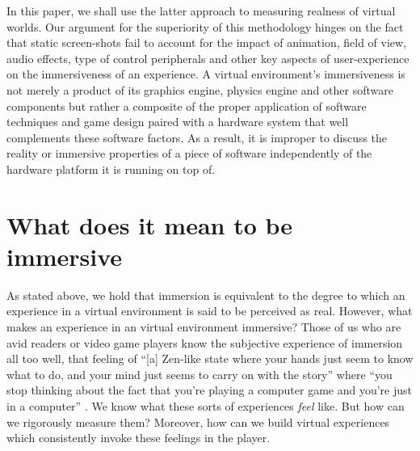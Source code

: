  In this paper, we shall use the latter approach to measuring realness of virtual worlds. Our argument for the superiority of this methodology hinges on the fact that static screen-shots fail to account for the impact of animation, field of view, audio effects, type of control peripherals and other key aspects of user-experience on the immersiveness of an experience. A virtual environment's immersiveness is not merely a product of its graphics engine, physics engine and other software components but rather a composite of the proper application of software techniques and game design paired with a hardware system that well complements these software factors. As a result, it is improper to discuss the reality or immersive properties of
a piece of software independently of the hardware platform it is running on top of. 
\section{What does it mean to be immersive}
As stated above, we hold that immersion is equivalent to the degree to which an experience in a virtual environment is said to be perceived as real. However, what makes an experience in an virtual environment immersive? Those of us who are avid readers or video game players know the subjective experience of immersion all too well, that feeling of  ``[a] Zen-like state where your hands just seem to know
what to do, and your mind just seems to carry on with
the story'' \cite{Brown04agrounded} where ``you stop thinking about the fact that you're
playing a computer game and you're just in a computer''  \cite{Brown04agrounded}. We know what these sorts of experiences \textit{feel} like. But how can we rigorously measure them? Moreover, how can we build virtual experiences which consistently invoke these feelings in the player.


